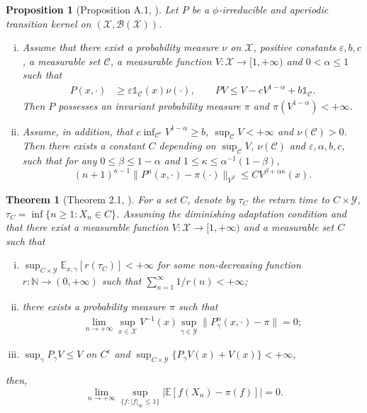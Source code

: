 \documentclass[pdflatex,sn-mathphys-num]{sn-jnl}
\newcommand{\ind}{\mathds{1}}
\renewcommand{\geq}{\geqslant}
\renewcommand{\leq}{\leqslant}
\theoremstyle{thmstyleone}
\newtheorem{theorem}{Theorem}
\newtheorem{proposition}{Proposition}
\theoremstyle{thmstyletwo}
\theoremstyle{thmstylethree}
\begin{document}
\begin{proposition}[Proposition A.1, \cite{atchade_limit_2010}]
Let $P$ be a $\phi$-irreducible and aperiodic transition kernel on $(\mathcal{X}, \mathcal{B}(\mathcal{X}))$.
\begin{enumerate}[(i)]
    \item Assume that there exist a probability measure $\nu$ on $\mathcal{X}$, positive constants $\varepsilon, b, c$, a measurable set $\mathcal{C}$, a measurable function $V:\mathcal{X} \to [1,+\infty)$ and $0 < \alpha \leq 1$ such that
    \begin{align}
    P(x,\cdot) &\geq \varepsilon \ind_\mathcal{C}(x)\nu(\cdot), 
    \qquad PV \leq V - cV^{1-\alpha} + b\ind_\mathcal{C}. 
    \end{align}
    Then $P$ possesses an invariant probability measure $\pi$ and $\pi(V^{1-\alpha}) < +\infty$.
    \item Assume, in addition, that $c \inf_{\mathcal{C}^c} V^{1-\alpha} \geq b$, $\sup_\mathcal{C} V < +\infty$ and $\nu(\mathcal{C}) > 0$. Then there exists a constant $C$ depending on $\sup_\mathcal{C} V$, $\nu(\mathcal{C})$ and $\varepsilon, \alpha, b, c$, such that for any $0 \leq \beta \leq 1 - \alpha$ and $1 \leq \kappa \leq \alpha^{-1}(1 - \beta)$,
    \begin{equation}
    (n+1)^{\kappa-1}\|P^n(x,\cdot) - \pi(\cdot)\|_{V^\beta} \leq CV^{\beta+\alpha\kappa}(x). \label{eq:convergence_rate}
    \end{equation}
\end{enumerate}
\label{appendix:proposition1}
\end{proposition}



\begin{theorem}[Theorem 2.1, \cite{atchade_limit_2010}]
    For a set $C$, denote by $\tau_C$ the return time to $C \times \mathcal{Y}$, $\tau_C = \inf\{n \geq 1 : X_n \in C\}$. Assuming the \textit{diminishing adaptation} condition and that there exist a measurable function $V \colon \mathcal{X} \to [1, +\infty)$ and a measurable set $C$ such that
    \begin{enumerate}[(i)]
    \item $\sup_{C \times \mathcal{Y}} \mathbb{E}_{x,\gamma}[r(\tau_C)] < +\infty$ for some non-decreasing function $r \colon \mathbb{N} \to (0, +\infty)$ such that $\sum_{n=1}^\infty 1/r(n) < +\infty$;
    \label{appendix:i}
    \item there exists a probability measure $\pi$ such that
    \begin{align*}
        \lim_{n\to+\infty} \sup_{x\in\mathcal{X}} V^{-1}(x) \sup_{\gamma \in \mathcal{Y}} \|P_\gamma^n(x,\cdot) - \pi\| = 0;
    \end{align*}
    \label{appendix:ii}
    \item $\sup_\gamma P_\gamma V \leq V$ on $C^c$ and $\sup_{C \times \mathcal{Y}} \{P_\gamma V(x) + V(x)\} < +\infty$,
     \label{appendix:iii}
\end{enumerate}

then,
\[
\lim_{n\to+\infty} \sup_{\{f : |f|_\infty \leq 1\}} \left|\mathbb{E}[f(X_n) - \pi(f)]\right| = 0.
\]
\label{appendix:thm4}
\end{theorem}
\end{document}
